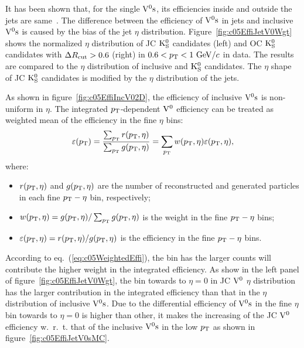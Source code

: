 It has been shown that,
for the single ${\rm V}^{0}{\rm s}$, its efficiencies inside and outside the jets are
same~\cite{Kucera:AliPWGJE20140328}.
The difference between the efficiency of ${\rm V}^{0}{\rm s}$ in jets and
inclusive ${\rm V}^{0}{\rm s}$ is caused by the bias of the jet $\eta$ distribution.
Figure~\ref{fig:c05EffiJetV0Wgt} shows the normalized $\eta$ distribution
of JC ${\rm K}_{\rm S}^{0}$ candidates (left) and OC ${\rm K}_{\rm S}^{0}$ candidates
with $\Delta R_{\rm cut}>0.6$ (right) in $0.6<p_{\rm T}<1~{\rm GeV}/c$ in data.
The results are compared to the $\eta$ distribution of inclusive
and ${\rm K}_{\rm S}^{0}$ candidates.
The $\eta$ shape of JC ${\rm K}_{\rm S}^{0}$ candidates is modified by
the $\eta$ distribution of the jets.

As shown in figure~\ref{fig:c05EffiIncV02D},
the efficiency of inclusive ${\rm V}^{0}{\rm s}$ is non-uniform in $\eta$.
The integrated $p_{\rm T}$-dependent ${\rm V}^{0}$ efficiency can be treated as
weighted mean of the efficiency in the fine $\eta$ bins:
\begin{equation}\label{eq:c05WeightedEffi}
\varepsilon(p_{\rm T})=\frac{\sum_{p_{\rm T}}r(p_{\rm T},\eta)}
                      {\sum_{p_{\rm T}}g(p_{\rm T},\eta)}
 =\sum_{p_{\rm T}}w(p_{\rm T},\eta)\varepsilon(p_{\rm T},\eta),
\end{equation}
where:
\begin{itemize}
\item $r(p_{\rm T},\eta)$ and $g(p_{\rm T},\eta)$ are the number of reconstructed and
      generated particles in each fine $p_{\rm T}-\eta$ bin, respectively;
\item $w(p_{\rm T},\eta)=g(p_{\rm T},\eta)/\sum_{p_{\rm T}}g(p_{\rm T},\eta)$ is the weight in the
      fine $p_{\rm T}-\eta$ bins;
\item $\varepsilon(p_{\rm T},\eta)=r(p_{\rm T},\eta)/g(p_{\rm T},\eta)$ is the efficiency
      in the fine $p_{\rm T}-\eta$ bins.
\end{itemize}
According to eq.~(\ref{eq:c05WeightedEffi}),
the bin has the larger counts will contribute the higher weight in the
integrated efficiency.
As show in the left panel of figure~\ref{fig:c05EffiJetV0Wgt},
the bin towards to $\eta=0$ in JC ${\rm V}^{0}$ $\eta$ distribution has the
larger contribution in the integrated efficiency than that in the $\eta$
distribution of inclusive ${\rm V}^{0}{\rm s}$.
Due to the differential efficiency of ${\rm V}^{0}{\rm s}$ in the fine $\eta$ bin
towards to $\eta=0$ is higher than other,
it makes the increasing of the JC ${\rm V}^{0}$ efficiency w.~r.~t. that of
the inclusive ${\rm V}^{0}{\rm s}$ in the low $p_{\rm T}$
as shown in figure~\ref{fig:c05EffiJetV0sMC}.

